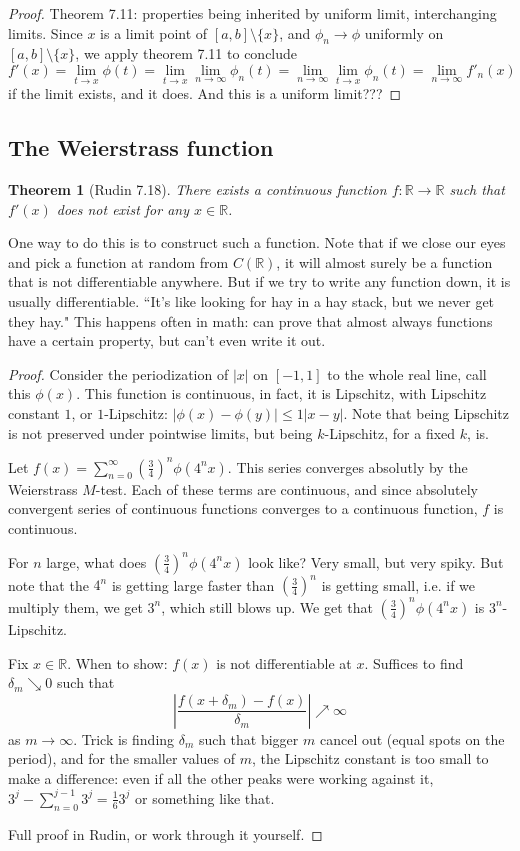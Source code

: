 \documentclass{article}
\theoremstyle{plain}
\newtheorem{theorem}{Theorem}
\theoremstyle{remark}
\newcommand{\R}{{\mathbb R}}
\begin{document}
\begin{proof}
	Theorem 7.11: properties being inherited by uniform limit,
	interchanging limits.
	Since $x$ is a limit point of $[a,b] \setminus \{x\}$,
	and $\phi_n \to \phi$ uniformly on $[a,b] \setminus \{x\}$,
	we apply theorem 7.11 to conclude
	\[
		f'(x) = \lim_{t \to x} \phi(t) =
		\lim_{t \to x} \lim_{n\to\infty} \phi_n(t)
		= \lim_{n\to\infty} \lim_{t \to x} \phi_n(t) = \lim_{n\to\infty} f'_n(x)
	\]
	if the limit exists, and it does.
	And this is a uniform limit???
\end{proof}

\subsection{The Weierstrass function}
\begin{theorem}[Rudin 7.18]
	There exists a continuous function $f \colon \R \to \R$ such that
	$f'(x)$ does not exist for any $x \in \R$.
\end{theorem}
One way to do this is to construct such a function.
Note that if we close our eyes and pick a function at random from $C(\R)$,
it will almost surely be a function that is not differentiable anywhere.
But if we try to write any function down, it is usually differentiable.
``It's like looking for hay in a hay stack, but we never get they hay."
This happens often in math: can prove that almost always functions have a certain property,
but can't even write it out.
\begin{proof}
	Consider the periodization of $|x|$ on $[-1,1]$ to the whole real line,
	call this $\phi(x)$.
	This function is continuous, in fact, it is Lipschitz,
	with Lipschitz constant $1$, or $1$-Lipschitz:
	$\lvert \phi(x) - \phi(y) \rvert \leq 1\lvert x-y \rvert$.
	Note that being Lipschitz is not preserved under pointwise limits,
	but being $k$-Lipschitz, for a fixed $k$, is.

	Let $f(x) = \sum_{n = 0}^\infty \left(\frac{3}{4}\right)^n \phi(4^n x)$.
	This series converges absolutly by the Weierstrass $M$-test.
	Each of these terms are continuous,
	and since absolutely convergent series of continuous functions
	converges to a continuous function, $f$ is continuous.

	For $n$ large, what does $\left(\frac{3}{4}\right)^n \phi(4^n x)$ look like?
	Very small, but very spiky.
	But note that the $4^n$ is getting large faster than
	$\left(\frac{3}{4}\right)^n$ is getting small,
	i.e. if we multiply them, we get $3^n$, which still blows up.
	We get that $\left(\frac{3}{4}\right)^n \phi(4^n x)$ is $3^n$-Lipschitz.
	
	Fix $x \in \R$.
	When to show: $f(x)$ is not differentiable at $x$.
	Suffices to find $\delta_m \searrow 0$ such that
	\[
		\left\lvert \frac{f(x + \delta_m) - f(x)}{\delta_m}\right\rvert \nearrow \infty
	\]
	as $m \to \infty$.
	Trick is finding $\delta_m$ such that
	bigger $m$ cancel out (equal spots on the period),
	and for the smaller values of $m$, the Lipschitz constant is too small
	to make a difference: even if all the other peaks were working against it,
	$3^j - \sum_{n=0}^{j-1} 3^j = \frac{1}{6}3^j$ or something like that.

	Full proof in Rudin, or work through it yourself.
\end{proof}
\end{document}
